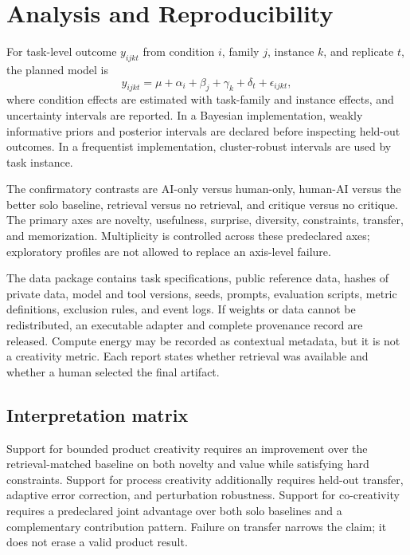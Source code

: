\documentclass[conference]{IEEEtran}
\begin{document}
\section{Analysis and Reproducibility}
\label{sec:analysis}

For task-level outcome $y_{ijkt}$ from condition $i$, family $j$, instance $k$, and
replicate $t$, the planned model is
\begin{equation}
y_{ijkt}=\mu+\alpha_i+\beta_j+\gamma_k+\delta_t+\epsilon_{ijkt},
\label{eq:model}
\end{equation}
where condition effects are estimated with task-family and instance effects, and
uncertainty intervals are reported. In a Bayesian implementation, weakly informative
priors and posterior intervals are declared before inspecting held-out outcomes. In a
frequentist implementation, cluster-robust intervals are used by task instance.

The confirmatory contrasts are AI-only versus human-only, human-AI versus the better
solo baseline, retrieval versus no retrieval, and critique versus no critique. The
primary axes are novelty, usefulness, surprise, diversity, constraints, transfer, and
memorization. Multiplicity is controlled across these predeclared axes; exploratory
profiles are not allowed to replace an axis-level failure.

The data package contains task specifications, public reference data, hashes of private
data, model and tool versions, seeds, prompts, evaluation scripts, metric definitions,
exclusion rules, and event logs. If weights or data cannot be redistributed, an
executable adapter and complete provenance record are released. Compute energy may be
recorded as contextual metadata, but it is not a creativity metric. Each report states
whether retrieval was available and whether a human selected the final artifact.

\subsection{Interpretation matrix}

Support for bounded product creativity requires an improvement over the
retrieval-matched baseline on both novelty and value while satisfying hard constraints.
Support for process creativity additionally requires held-out transfer, adaptive error
correction, and perturbation robustness. Support for co-creativity requires a predeclared
joint advantage over both solo baselines and a complementary contribution pattern.
Failure on transfer narrows the claim; it does not erase a valid product result.
\end{document}
